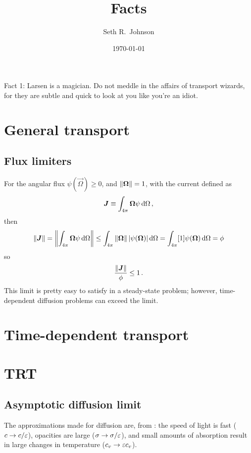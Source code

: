 \documentclass[11pt]{SRJresearch}
\author{Seth R.~Johnson}
\date{\today}
\title{Facts}
\begin{document}
Fact 1: Larsen is a magician. Do not meddle in the affairs of transport
wizards, for they are subtle and quick to look at you like you're an idiot.
\section{General transport}

\subsection{Flux limiters}

For the angular flux $\psi(\vec{\Omega}) \ge 0$, and $\left\| \bm{\Omega} \right\| = 1$,
with the current defined as
\begin{equation*}
  \bm{J} \equiv \int_{4\pi} \bm{\Omega} \psi\mathop{}\!\mathrm{d} \Omega \,,
\end{equation*}
then
\begin{equation*}
  \left\| \bm{J} \right\| = \left\| \int_{4\pi} \bm{\Omega} \psi\mathop{}\!\mathrm{d} \Omega  \right\|
  \le \int_{4\pi} \left\| \bm{\Omega}  \right\| \left| \psi(\bm{\Omega}) \right| \mathop{}\!\mathrm{d} \Omega 
  = \int_{4\pi} [1] \psi(\bm{\Omega}) \mathop{}\!\mathrm{d} \Omega 
  = \phi
\end{equation*}
so
\begin{equation*}
  \frac{ \left\| \bm{J} \right\| }{\phi} \le 1\,.
\end{equation*}
This limit is pretty easy to satisfy in a steady-state problem; however,
time-dependent diffusion problems can exceed the limit.

\section{Time-dependent transport}
\section{TRT}

\subsection{Asymptotic diffusion limit}
The approximations made for diffusion are, from \cite{Den2004}:
the speed of light is fast ($c \to c/\varepsilon$),
opacities are large ($\sigma \to \sigma/\varepsilon$),
and small amounts of absorption result in large changes in temperature ($c_v
  \to \varepsilon c_v$).


\end{document}
